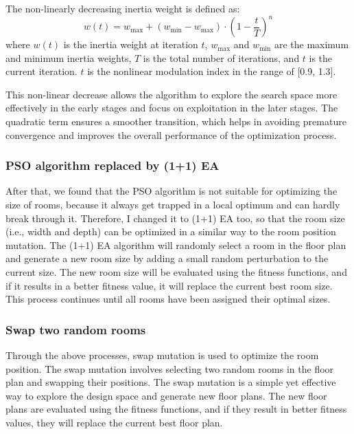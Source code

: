 \documentclass[]{article}
\begin{document}
The non-linearly decreasing inertia weight is defined as:
\begin{equation*}
    w(t) = w_{\text{max}} + (w_{\text{min}} - w_{\text{max}}) \cdot \left(1 - \frac{t}{T}\right)^n
\end{equation*}
where $w(t)$ is the inertia weight at iteration $t$, $w_{\text{max}}$ and $w_{\text{min}}$ are the maximum and minimum inertia weights, $T$ is the total number of iterations, and $t$ is the current iteration. $t$ is the nonlinear modulation index in the range of [0.9, 1.3].

This non-linear decrease allows the algorithm to explore the search space more effectively in the early stages and focus on exploitation in the later stages. The quadratic term ensures a smoother transition, which helps in avoiding premature convergence and improves the overall performance of the optimization process.

\subsubsection{PSO algorithm replaced by (1+1) EA}
After that, we found that the PSO algorithm is not suitable for optimizing the size of rooms, because it always get trapped in a local optimum and can hardly break through it. Therefore, I changed it to (1+1) EA too, so that the room size (i.e., width and depth) can be optimized in a similar way to the room position mutation. The (1+1) EA algorithm will randomly select a room in the floor plan and generate a new room size by adding a small random perturbation to the current size. The new room size will be evaluated using the fitness functions, and if it results in a better fitness value, it will replace the current best room size. This process continues until all rooms have been assigned their optimal sizes.

\subsubsection{Swap two random rooms}
Through the above processes, swap mutation is used to optimize the room position. The swap mutation involves selecting two random rooms in the floor plan and swapping their positions. The swap mutation is a simple yet effective way to explore the design space and generate new floor plans. The new floor plans are evaluated using the fitness functions, and if they result in better fitness values, they will replace the current best floor plan.
\end{document}

